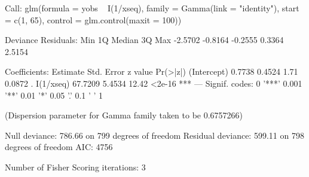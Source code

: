 \begin{Schunk}
\begin{Soutput}
Call:
glm(formula = yobs ~ I(1/xseq), family = Gamma(link = "identity"), 
    start = c(1, 65), control = glm.control(maxit = 100))

Deviance Residuals: 
    Min       1Q   Median       3Q      Max  
-2.5702  -0.8164  -0.2555   0.3364   2.5154  

Coefficients:
            Estimate Std. Error z value Pr(>|z|)    
(Intercept)   0.7738     0.4524    1.71   0.0872 .  
I(1/xseq)    67.7209     5.4534   12.42   <2e-16 ***
---
Signif. codes:  0 '***' 0.001 '**' 0.01 '*' 0.05 '.' 0.1 ' ' 1

(Dispersion parameter for Gamma family taken to be 0.6757266)

    Null deviance: 786.66  on 799  degrees of freedom
Residual deviance: 599.11  on 798  degrees of freedom
AIC: 4756

Number of Fisher Scoring iterations: 3
\end{Soutput}
\begin{Sinput}
 
\end{Sinput}
\end{Schunk}
